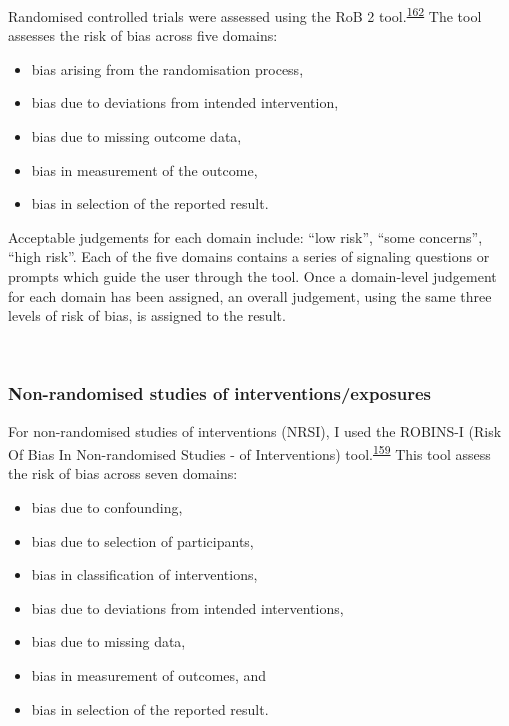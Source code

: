 \documentclass[a4paper, twoside]{templates/ociamthesis}
\providecommand{\tightlist}{%
  \setlength{\itemsep}{0pt}\setlength{\parskip}{0pt}}
\begin{document}
Randomised controlled trials were assessed using the RoB 2 tool.\textsuperscript{\protect\hyperlink{ref-sterne2019}{162}} The tool assesses the risk of bias across five domains:

\begin{itemize}
\tightlist
\item
  bias arising from the randomisation process,
\item
  bias due to deviations from intended intervention,
\item
  bias due to missing outcome data,
\item
  bias in measurement of the outcome,
\item
  bias in selection of the reported result.
\end{itemize}

Acceptable judgements for each domain include: ``low risk'', ``some concerns'', ``high risk''. Each of the five domains contains a series of signaling questions or prompts which guide the user through the tool. Once a domain-level judgement for each domain has been assigned, an overall judgement, using the same three levels of risk of bias, is assigned to the result.

~

\hypertarget{rob-tools-nrse}{%
\subsubsection{Non-randomised studies of interventions/exposures}\label{rob-tools-nrse}}

For non-randomised studies of interventions (NRSI), I used the ROBINS-I (Risk Of Bias In Non-randomised Studies - of Interventions) tool.\textsuperscript{\protect\hyperlink{ref-sterne2016}{159}} This tool assess the risk of bias across seven domains:

\begin{itemize}
\tightlist
\item
  bias due to confounding,
\item
  bias due to selection of participants,
\item
  bias in classification of interventions,
\item
  bias due to deviations from intended interventions,
\item
  bias due to missing data,
\item
  bias in measurement of outcomes, and
\item
  bias in selection of the reported result.
\end{itemize}
\end{document}
